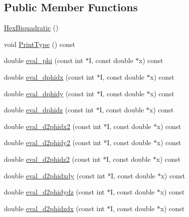 \subsection*{Public Member Functions}
\begin{DoxyCompactItemize}
\item 
\mbox{\hyperlink{classfemus_1_1_hex_biquadratic_ad25fadf806442cad0100ff1a059f8e9f}{Hex\+Biquadratic}} ()
\item 
void \mbox{\hyperlink{classfemus_1_1_hex_biquadratic_a47c356518c173ac4dc43671e5747f7a8}{Print\+Type}} () const
\item 
double \mbox{\hyperlink{classfemus_1_1_hex_biquadratic_aaf08e83ba3ba1eb6f5e27cfafd1af391}{eval\+\_\+phi}} (const int $\ast$I, const double $\ast$x) const
\item 
double \mbox{\hyperlink{classfemus_1_1_hex_biquadratic_a751fe53056f2ca2e10559ec75253469e}{eval\+\_\+dphidx}} (const int $\ast$I, const double $\ast$x) const
\item 
double \mbox{\hyperlink{classfemus_1_1_hex_biquadratic_afa4cdce4824df2744096af085ab1281e}{eval\+\_\+dphidy}} (const int $\ast$I, const double $\ast$x) const
\item 
double \mbox{\hyperlink{classfemus_1_1_hex_biquadratic_a1dbed34250925ec85764871142ce3597}{eval\+\_\+dphidz}} (const int $\ast$I, const double $\ast$x) const
\item 
double \mbox{\hyperlink{classfemus_1_1_hex_biquadratic_a61e90ab66788a1fed2c6515d514a7642}{eval\+\_\+d2phidx2}} (const int $\ast$I, const double $\ast$x) const
\item 
double \mbox{\hyperlink{classfemus_1_1_hex_biquadratic_a474b484fb23845775c3a5ec26b829784}{eval\+\_\+d2phidy2}} (const int $\ast$I, const double $\ast$x) const
\item 
double \mbox{\hyperlink{classfemus_1_1_hex_biquadratic_a4810a64e48546a6d0fc3050dccbc5f1b}{eval\+\_\+d2phidz2}} (const int $\ast$I, const double $\ast$x) const
\item 
double \mbox{\hyperlink{classfemus_1_1_hex_biquadratic_ac95c76060992afc10491cfe13df048d5}{eval\+\_\+d2phidxdy}} (const int $\ast$I, const double $\ast$x) const
\item 
double \mbox{\hyperlink{classfemus_1_1_hex_biquadratic_a5281e98ab81a4e3cf554534176d63106}{eval\+\_\+d2phidydz}} (const int $\ast$I, const double $\ast$x) const
\item 
double \mbox{\hyperlink{classfemus_1_1_hex_biquadratic_a80b2ad19492b390c105682b7d976bbb6}{eval\+\_\+d2phidzdx}} (const int $\ast$I, const double $\ast$x) const
\end{DoxyCompactItemize}
